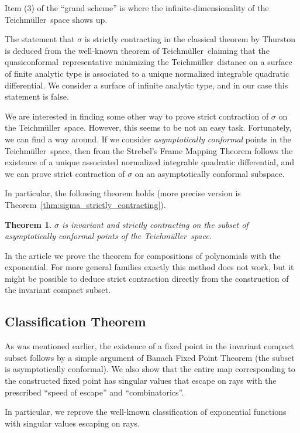 \documentclass[10pt,reqno,a4paper]{amsart}
\numberwithin{figure}{section}
\numberwithin{equation}{section}
\newtheorem*{thmnonum}{Theorem}
\newcommand{\tei}{Teichm\"uller}
\newcommand{\qc}{quasiconformal}
\begin{document}
Item (3) of the ``grand scheme'' is where the infinite-dimensionality of the \tei\ space shows up.

The statement that $\sigma$ is strictly contracting in the classical theorem by Thurston is deduced from the well-known theorem of \tei\ claiming that the \qc\ representative minimizing the \tei\ distance on a surface of finite analytic type is associated to a unique normalized integrable quadratic differential. We consider a surface of infinite analytic type, and in our case this statement is false. 

We are interested in finding some other way to prove strict contraction of $\sigma$ on the \tei\ space. However, this seems to be not an easy task. Fortunately, we can find a way around. If we consider \emph{asymptotically conformal} points in the \tei\ space, then from the Strebel's Frame Mapping Theorem follows the existence of a unique associated normalized integrable quadratic differential, and we can prove strict contraction of $\sigma$ on an asymptotically conformal subspace.

In particular, the following theorem holds (more precise version is Theorem~\ref{thm:sigma_strictly_contracting}).

\begin{thmnonum}
	$\sigma$ is invariant and strictly contracting on the subset of asymptotically conformal points of the \tei\ space.
\end{thmnonum}

In the article we prove the theorem for compositions of polynomials with the exponential. For more general families exactly this method does not work, but it might be possible to deduce strict contraction directly from the construction of the invariant compact subset.

\subsection*{Classification Theorem}

As was mentioned earlier, the existence of a fixed point in the invariant compact subset follows by a simple argument of Banach Fixed Point Theorem (the subset is asymptotically conformal). We also show that the entire map corresponding to the constructed fixed point has singular values that escape on rays with the prescribed ``speed of escape'' and ``combinatorics''.

In particular, we reprove the well-known classification of exponential functions with singular values escaping on rays.
\end{document}
